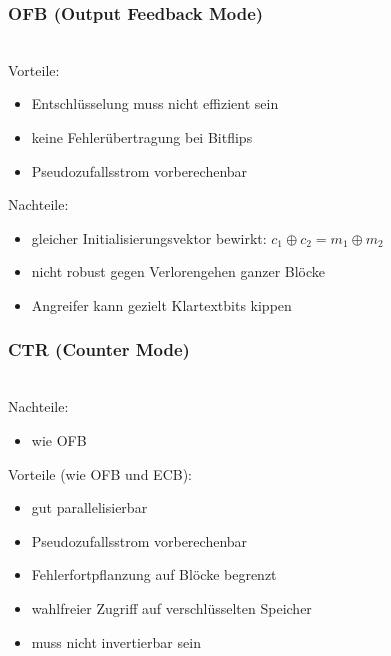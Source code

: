 \documentclass[a4paper,twoside,DIV15,BCOR12mm]{scrbook}
\begin{document}
\subsubsection{OFB (Output Feedback Mode)}

\\

Vorteile:

\begin{itemize}
	\item Entschlüsselung muss nicht effizient sein
	\item keine Fehlerübertragung bei Bitflips
	\item Pseudozufallsstrom vorberechenbar
\end{itemize}

Nachteile:

\begin{itemize}
	\item gleicher Initialisierungsvektor bewirkt: $c_1 \oplus c_2 = m_1 \oplus m_2$
	\item nicht robust gegen Verlorengehen ganzer Blöcke
	\item Angreifer kann gezielt Klartextbits kippen
\end{itemize}

\subsubsection{CTR (Counter Mode)}

\\

Nachteile:

\begin{itemize}
	\item wie OFB
\end{itemize}

Vorteile (wie OFB und ECB):

\begin{itemize}	
	\item gut parallelisierbar
	\item Pseudozufallsstrom vorberechenbar
	\item Fehlerfortpflanzung auf Blöcke begrenzt
	\item wahlfreier Zugriff auf verschlüsselten Speicher
	\item muss nicht invertierbar sein
\end{itemize}

\end{document}
